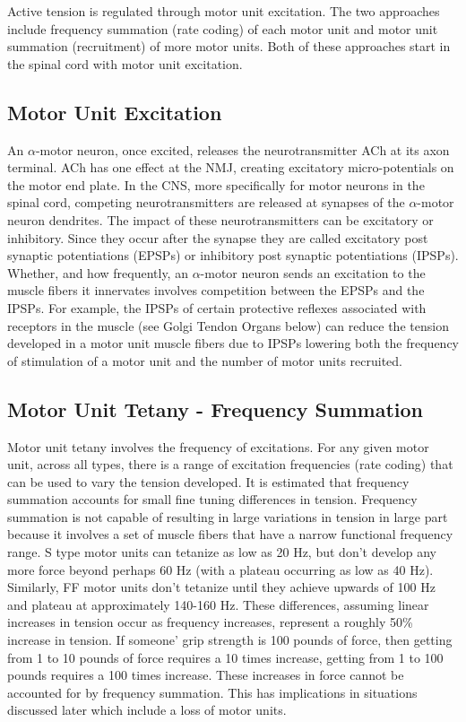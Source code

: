 Active tension is regulated through motor unit excitation. The two approaches include frequency summation (rate coding) of each motor unit and motor unit summation (recruitment) of more motor units. Both of these approaches start in the spinal cord with motor unit excitation.

\subsection{Motor Unit Excitation}

An $\alpha$-motor neuron, once excited, releases the neurotransmitter ACh at its axon terminal. ACh has one effect at the NMJ, creating excitatory micro-potentials on the motor end plate. In the CNS, more specifically for motor neurons in the spinal cord, competing neurotransmitters are released at synapses of the $\alpha$-motor neuron dendrites. The impact of these neurotransmitters can be excitatory or inhibitory. Since they occur after the synapse they are called excitatory post synaptic potentiations (EPSPs) or inhibitory post synaptic potentiations (IPSPs). Whether, and how frequently, an $\alpha$-motor neuron sends an excitation to the muscle fibers it innervates involves competition between the EPSPs and the IPSPs. For example, the IPSPs of certain protective reflexes associated with receptors in the muscle (see Golgi Tendon Organs below) can reduce the tension developed in a motor unit muscle fibers due to IPSPs lowering both the frequency of stimulation of a motor unit and the number of motor units recruited.

\subsection{Motor Unit Tetany - Frequency Summation}

Motor unit tetany involves the frequency of excitations. For any given motor unit, across all types, there is a range of excitation frequencies (rate coding) that can be used to vary the tension developed. It is estimated that frequency summation accounts for small fine tuning differences in tension. Frequency summation is not capable of resulting in large variations in tension in large part because it involves a set of muscle fibers that have a narrow functional frequency range. S type motor units can tetanize as low as 20 Hz, but don't develop any more force beyond perhaps 60 Hz (with a plateau occurring as low as 40 Hz). Similarly, FF motor units don't tetanize until they achieve upwards of 100 Hz and plateau at approximately 140-160 Hz. These differences, assuming linear increases in tension occur as frequency increases, represent a roughly 50\% increase in tension. If someone' grip strength is 100 pounds of force, then getting from 1 to 10 pounds of force requires a 10 times increase, getting from 1 to 100 pounds requires a 100 times increase. These increases in force cannot be accounted for by frequency summation. This has implications in situations discussed later which include a loss of motor units.

